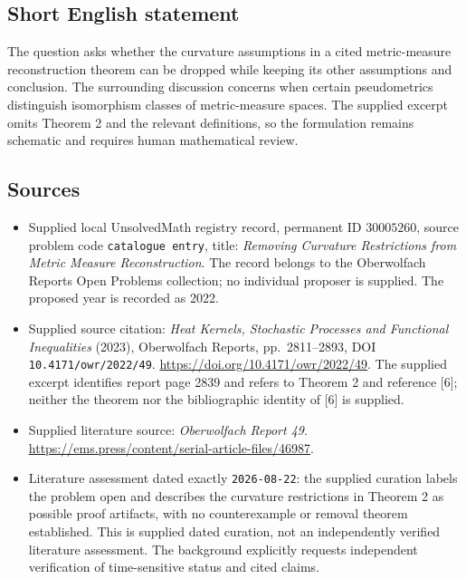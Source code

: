 \documentclass[11pt]{article}
\begin{document}
\subsection{Short English statement}
The question asks whether the curvature assumptions in a cited metric-measure reconstruction theorem can be dropped while keeping its other assumptions and conclusion. The surrounding discussion concerns when certain pseudometrics distinguish isomorphism classes of metric-measure spaces. The supplied excerpt omits Theorem 2 and the relevant definitions, so the formulation remains schematic and requires human mathematical review.
\subsection{Sources}
\begin{itemize}
\item Supplied local UnsolvedMath registry record, permanent ID \(30005260\), source problem code \texttt{catalogue entry}, title: \emph{Removing Curvature Restrictions from Metric Measure Reconstruction}. The record belongs to the Oberwolfach Reports Open Problems collection; no individual proposer is supplied. The proposed year is recorded as 2022.
\item Supplied source citation: \emph{Heat Kernels, Stochastic Processes and Functional Inequalities} (2023), Oberwolfach Reports, pp.\ 2811--2893, DOI \texttt{10.4171/owr/2022/49}. \url{https://doi.org/10.4171/owr/2022/49}. The supplied excerpt identifies report page 2839 and refers to Theorem 2 and reference [6]; neither the theorem nor the bibliographic identity of [6] is supplied.
\item Supplied literature source: \emph{Oberwolfach Report 49}. \url{https://ems.press/content/serial-article-files/46987}.
\item Literature assessment dated exactly \texttt{2026-08-22}: the supplied curation labels the problem open and describes the curvature restrictions in Theorem 2 as possible proof artifacts, with no counterexample or removal theorem established. This is supplied dated curation, not an independently verified literature assessment. The background explicitly requests independent verification of time-sensitive status and cited claims.
\end{itemize}
\end{document}
